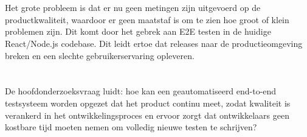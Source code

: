 

\section{}%
\label{sec:probleemstelling}


Het grote probleem is dat er nu geen metingen zijn uitgevoerd op de productkwaliteit, waardoor er geen maatstaf is om te zien hoe groot of klein problemen zijn. Dit komt door het gebrek aan E2E testen in de huidige React/Node.js codebase. Dit leidt ertoe dat releases naar de productieomgeving breken en een slechte gebruikerservaring opleveren.

\section{}%
\label{sec:onderzoeksvraag}


De hoofdonderzoeksvraag luidt: hoe kan een geautomatiseerd end-to-end testsysteem worden opgezet dat het product continu meet, zodat kwaliteit is verankerd in het ontwikkelingsproces en ervoor zorgt dat ontwikkelaars geen kostbare tijd moeten nemen om volledig nieuwe testen te schrijven?


